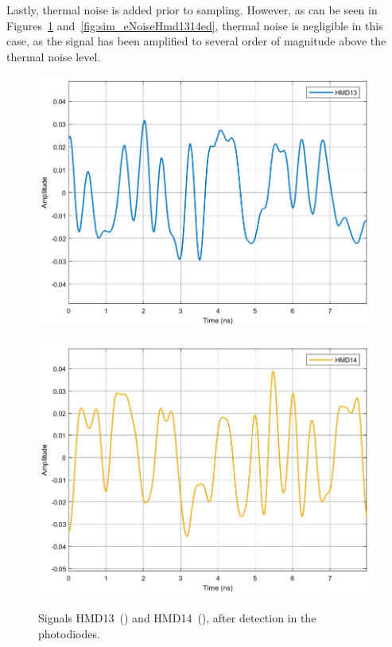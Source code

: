 Lastly, thermal noise is added prior to sampling. However, as can be seen in 
Figures~\ref{fig:sim_eNoiseHmd1314} and~\ref{fig:sim_eNoiseHmd1314ed}, thermal 
noise is negligible in this case, as the signal has been amplified to several 
order of magnitude above the thermal noise level.

\begin{figure}[H]
	\centering
	\begin{minipage}{0.45\textwidth}
		\centering
		\includegraphics[width=1\textwidth]		
		{./sdf/m_qam_system/figures/simulations/03_eNoise/HMD13.pdf}
		\subcaption{}\label{fig:sim_eNoiseHmd13}
	\end{minipage}
	\begin{minipage}{0.45\textwidth}
		\centering
		\includegraphics[width=1\textwidth]
		{sdf/m_qam_system/figures/simulations/03_eNoise/HMD14.pdf}
		\subcaption{}\label{fig:sim_eNoiseHmd14}
	\end{minipage}
	\caption{Signals HMD13~() and 
		HMD14~(), after detection in the 
		photodiodes.}\label{fig:sim_eNoiseHmd1314}
\end{figure}


